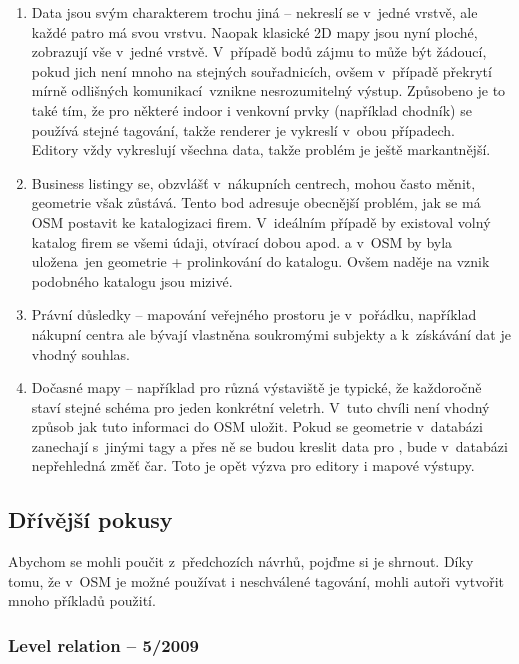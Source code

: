 \begin{enumerate}

\item
  Data jsou svým charakterem trochu jiná -- nekreslí se v~jedné vrstvě, ale každé patro má svou vrstvu. Naopak klasické 2D mapy jsou nyní ploché, zobrazují vše v~jedné vrstvě. V~případě bodů zájmu to může být žádoucí, pokud jich není mnoho na stejných souřadnicích, ovšem v~případě překrytí mírně odlišných komunikací~vznikne nesrozumitelný výstup. Způsobeno je to také tím, že pro některé indoor i venkovní prvky (například chodník) se používá stejné tagování, takže renderer je vykreslí v~obou případech.\\
  Editory vždy vykreslují všechna data, takže problém je ještě markantnější.
\item
  Business listingy se, obzvlášť v~nákupních centrech, mohou často měnit, geometrie však zůstává. Tento bod adresuje obecnější problém, jak se má OSM postavit ke katalogizaci firem. V~ideálním případě by existoval volný katalog firem se všemi údaji, otvírací dobou apod. a v~OSM by byla uložena~jen geometrie + prolinkování do katalogu. Ovšem naděje na vznik podobného katalogu jsou mizivé.
\item
  Právní důsledky -- mapování veřejného prostoru je v~pořádku, například nákupní centra ale bývají vlastněna soukromými subjekty a k~získávání dat je vhodný souhlas.
\item
  Dočasné mapy -- například pro různá výstaviště je typické, že každoročně staví stejné schéma pro jeden konkrétní veletrh. V~tuto chvíli není vhodný způsob jak tuto informaci do OSM uložit. Pokud se geometrie v~databázi zanechají s~jinými tagy a přes ně se budou kreslit data pro , bude v~databázi nepřehledná změť čar. Toto je opět výzva pro editory i mapové výstupy.
\end{enumerate}

\subsection{Dřívější pokusy}\label{dux159uxedvux11bjux161uxed-pokusy}

Abychom se mohli poučit z~předchozích návrhů, pojďme si je shrnout. Díky tomu, že v~OSM je možné používat i neschválené tagování, mohli autoři vytvořit mnoho příkladů použití.

\subsubsection{Level relation -- 5/2009}\label{level-relation-52009}

